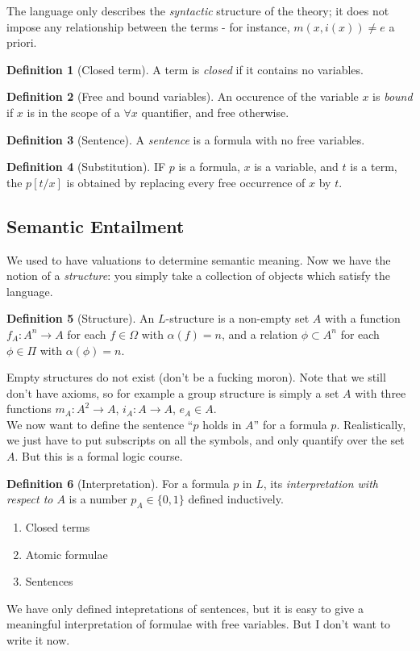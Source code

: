 \documentclass{article}
\theoremstyle{definition}
\newtheorem{definition}{Definition}
\numberwithin{definition}{section}
\begin{document}
The language only describes the \textit{syntactic} structure of the theory; it does not impose any relationship between the terms - for instance, $m(x,i(x)) \ne e$ a priori.
\begin{definition}[Closed term]
A term is \emph{closed} if it contains no variables.
\end{definition} 
\begin{definition}[Free and bound variables]
An occurence of the variable $x$ is \textit{bound} if $x$ is in the scope of a $\forall x$ quantifier, and free otherwise.  
\end{definition}
\begin{definition}[Sentence]
A \textit{sentence} is a formula with no free variables. 
\end{definition}
\begin{definition}[Substitution]
IF $p$ is a formula, $x$ is a variable, and $t$ is a term, the $p[t/x]$ is obtained by replacing every free occurrence of $x$ by $t$. 
\end{definition}

\subsection{Semantic Entailment}
We used to have valuations to determine semantic meaning. Now we have the notion of a \textit{structure}: you simply take a collection of objects which satisfy the language. 

\begin{definition}[Structure]
An $L$-structure is a non-empty set $A$ with a function $f_{A}:A^{n} \to A$ for each $f \in \Omega$ with $\alpha(f) = n$, and a relation $\phi \subset A^{n}$ for each $\phi \in \Pi$ with $\alpha(\phi) = n$. 
\end{definition}

Empty structures do not exist (don't be a fucking moron). Note that we still don't have axioms, so for example a group structure is simply a set $A$ with three functions $m_{A}: A^{2} \to A$, $i_{A} : A \to A$, $e_{A} \in A$. \\
We now want to define the sentence ``$p$ holds in $A$'' for a formula $p$. Realistically, we just have to put subscripts on all the symbols, and only quantify over the set $A$. But this is a formal logic course. \\
\begin{definition}[Interpretation]
For a formula $p$ in $L$, its \textit{interpretation with respect to $A$} is a number $p_{A} \in \{0,1\}$ defined inductively. 
\begin{enumerate}[i]
\item Closed terms
\item Atomic formulae
\item Sentences
\end{enumerate}
\end{definition}
We have only defined intepretations of sentences, but it is easy to give a meaningful interpretation of formulae with free variables. But I don't want to write it now. 
\end{document}
